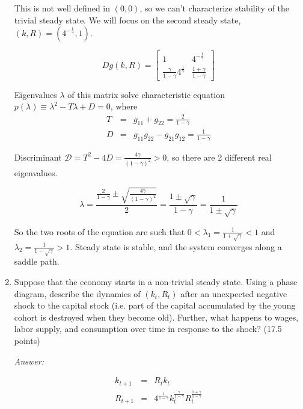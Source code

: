 \documentclass{article}
\begin{document}
\begin{enumerate}
This is not well defined in $(0,0)$, so we can't characterize
stability of the trivial steady state. We will focus on the second
steady state, $(k,R)=(4^{-\frac{1}{\gamma}}, 1)$.

\begin{equation*}
  Dg(k,R)=
  \begin{bmatrix}
    1 & 4^{-\frac{1}{\gamma}}\\
    \frac{\gamma}{1-\gamma}4^{\frac{1}{\gamma}}&\frac{1+\gamma}{1-\gamma}
  \end{bmatrix}
\end{equation*}

Eigenvalues $\lambda$ of this matrix solve characteristic equation
$p(\lambda)\equiv\lambda^2-T\lambda+D=0$, where
\begin{eqnarray*}
  T&=&g_{11}+g_{22}=\frac{2}{1-\gamma}\\
  D&=&g_{11}g_{22}-g_{21}g_{12}=\frac{1}{1-\gamma}
\end{eqnarray*}

Discriminant $\mathcal{D}=T^2-4D=\frac{4\gamma}{(1-\gamma)^2}>0$, so
  there are 2 different real eigenvalues.

  \begin{equation*}
    \lambda=\frac{\frac{2}{1-\gamma}\pm\sqrt{\frac{4\gamma}{(1-\gamma)^2}}}{2}=
    \frac{1\pm\sqrt{\gamma}}{1-\gamma}=\frac{1}{1\pm\sqrt{\gamma}}
  \end{equation*}


  So the two roots of the equation are such that $0<\lambda_1=\frac{1}{1+\sqrt{\gamma}}<1$ and
  $\lambda_2=\frac{1}{1-\sqrt{\gamma}}>1$. Steady state is stable, and the system converges
  along a saddle path.

\item Suppose that the economy starts in a non-trivial steady
  state. Using a phase diagram, describe the dynamics of
  $(k_{t},R_{t})$ after an unexpected negative shock to the capital
  stock (i.e. part of the capital accumulated by the young cohort is
  destroyed when they become old). Further, what happens to wages,
  labor supply, and consumption over time in response to the shock?
  (17.5 points)

\textit{Answer:}

\begin{eqnarray*}
  k_{t+1}&=&R_tk_t\\
  R_{t+1}&=&4^\frac{1}{{1-\gamma}}k_{t}^\frac{\gamma}{1-\gamma}R_{t}^\frac{1+\gamma}{1-\gamma}
\end{eqnarray*}


\end{enumerate}
\end{document}
